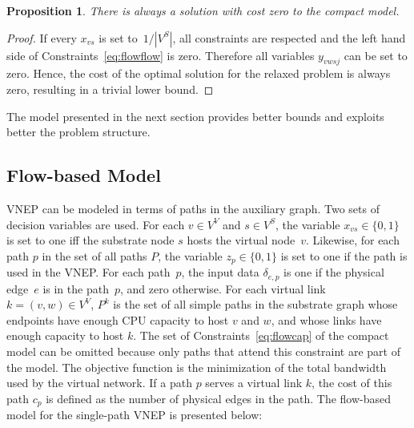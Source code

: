 \documentclass[conference]{IEEEtran}
\newtheorem{proposition}{Proposition}
\begin{document}
\begin{proposition}
There is always a solution with cost zero to the compact model.
\end{proposition}

\begin{proof}
If every $x_{vs}$ is set to~$1 / |V^S| $, all constraints are respected and the left hand side of Constraints~\eqref{eq:flowflow} is zero. 
Therefore all variables $y_{vwsj}$ can be set to zero.
Hence, the cost of the optimal solution for the relaxed problem is always zero, resulting in a trivial lower bound.
\end{proof}

The model presented in the next section provides better bounds and exploits better the problem structure.


\subsection{Flow-based Model}
\label{sec:flow}

VNEP can be modeled in terms of paths in the auxiliary graph. %
Two sets of decision variables are used. For each $v \in V^{V}$ and $s \in V^{S}$, the variable $x_{vs} \in \{0,1\}$ is set to one iff the substrate node $s$ hosts the virtual node~$v$. 
Likewise, for each path $p$ in the set of all paths $P$, the variable $z_{p} \in \{0,1\}$ is set to one if the path is used in the VNEP. 
For each path~$p$, the input data $\delta_{e,p}$ is one if the physical edge~$e$ is in the path~$p$, and zero otherwise.
For each virtual link $k=(v,w) \in V^V$, $P^k$ is the set of all simple paths in the substrate graph whose endpoints have enough CPU capacity to host $v$ and $w$, and whose links have enough capacity to host $k$.
The set of Constraints~\eqref{eq:flowcap} of the compact model can be omitted because only paths that attend this constraint are part of the model.
The objective function is the minimization of the total bandwidth used by the virtual network. 
If a path $p$ serves a virtual link $k$, the cost of this path $c_{p}$ is defined as the number of physical edges in the path.
The flow-based model for the single-path VNEP is presented below:
\end{document}
